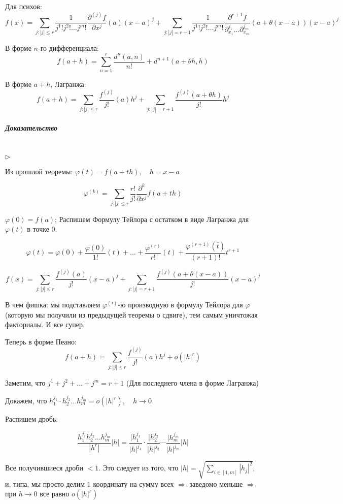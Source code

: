 \documentclass{article}
\let\vanillasubparagraph\subparagraph
\renewcommand{\subparagraph}[1]{\vanillasubparagraph{#1}\mbox{}\\}
\begin{document}
Для психов:
$$
f(x) = \sum_{j:|j| \leq r} \frac{1}{j^1!j^2!\dots j^m!} \frac {\partial^{(j)}f}{\partial x^j}(a) (x-a)^j + \sum_{j:|j|= r + 1} \frac{1} {j^1!j^2!\dots j^m!} \frac{\partial^{r + 1} f} {\partial_{x_1}^{j_1}\dots \partial_{x_m}^{j_m}} (a + \theta(x-a)) (x-a)^j
$$

В форме $n$-го дифференциала:
$$
f(a + h) = \sum_{n=1}^r \frac{d^n(a, n)}{n!} + d^{n+1}(a + \theta h, h)
$$

В форме $a + h$, Лагранжа:
$$
f(a + h) = \sum_{j:|j| \leq r} \frac{f^{(j)}}{j!}(a)h^j + \sum_{j: |j| = r + 1} \frac{f^{(j)}(a + \theta h)} {j!} h^j
$$

\subparagraph{Доказательство}

$\rhd$

Из прошлой теоремы: $\varphi(t) = f(a+th), \quad h = x - a$

$$
\varphi^{(k)} = \sum_{j:|j| \leq r} \frac{r!}{j!} \frac{\partial^k}{\partial x^j} f(a + th)
$$

$\varphi(0) = f(a)$; Распишем Формулу Тейлора с остатком в виде Лагранжа для $\varphi(t)$ в точке $0$.

$$
\varphi(t) = \varphi(0) + \frac{\varphi(0)}{1!}(t) + \dots + \frac{\varphi^{(r)}}{r!}(t) + \frac{\varphi^{(r + 1)} (\bar t)} {(r+1)!} t^{r+1}
$$

$$
f(x) = \sum_{j: |j| \leq r} \frac{f^{(j)}(a)}{j!} (x-a)^j + \sum_{j: |j| = r + 1} \frac{f^{(j)}(a + \theta(x-a))}{j!} (x-a)^j
$$

В чем фишка: мы подставляем $\varphi^{(i)}$-ю производную в формулу Тейлора для $\varphi$ (которую мы получили из предыдущей теоремы о сдвиге), тем самым уничтожая факториалы. И все супер.


Теперь в форме Пеано:
$$
f(a + h) = \sum_{j:|j| \leq r} \frac{f^{(j)}}{j!}(a)h^j + o(|h|^r)
$$

Заметим, что $j^1 + j^2 + \dots +j^m = r+1$ (Для последнего члена в форме Лагранжа)

Докажем, что $h_1^{j_1} \cdot h_2^{j_2} \dots h_m^{j_m} = o(|h|^r),\quad h \to 0$

Распишем дробь:

$$
\frac{h_1^{j_1} h_2^{j_2} \dots h_m^{j_m}} {|h^r|} |h| = \frac{|h_1^{j_1}}{|h|^{j_1}} \cdot \frac{|h_2^{j_2}}{|h|^{j_2}} \cdots \frac{|h_m^{j_m}}{|h|^{j_m}} |h|
$$

Все получившиеся дроби $< 1$. Это следует из того, что $|h| = \sqrt{\sum_{i\in[1,m]} |h_j|^2}$, и, типа, мы просто делим $1$ координату на сумму всех $\Rightarrow$ заведомо меньше $\Rightarrow$ при $h\to0$ все равно $o(|h|^r)$
\end{document}
